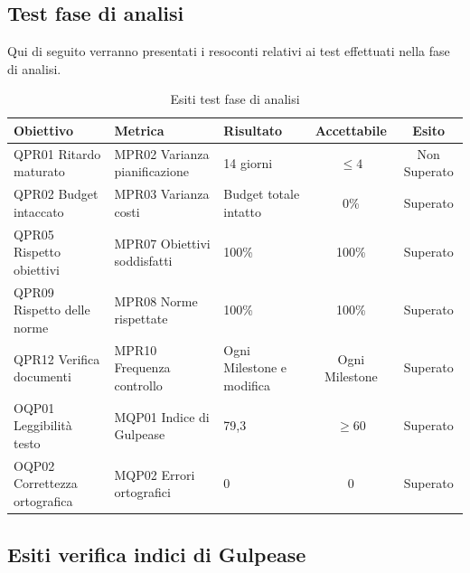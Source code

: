 \documentclass[../piano_di_qualifica.tex]{subfiles}
\begin{document}
\subsection{Test fase di analisi}
Qui di seguito verranno presentati i resoconti relativi ai test effettuati nella fase di analisi. \par

\begin{table}[!ht]
	\centering
	\begin{tabular}{|p{4cm}|p{4cm}|l|c|c|}
		\hline
		\rowcolor{lightgray}
		\textbf{Obiettivo}            & \textbf{Metrica}              & \textbf{Risultato}                     & \textbf{Accettabile} & \textbf{Esito} \\
		\hline
		QPR01 Ritardo maturato        & MPR02 Varianza pianificazione & 14 giorni                              & \(\leq 4\)           & Non Superato   \\
		QPR02 Budget intaccato        & MPR03 Varianza costi          & Budget totale intatto & 0\%                  & Superato       \\
		QPR05 Rispetto obiettivi      & MPR07 Obiettivi soddisfatti   & 100\%                                  & 100\%                & Superato       \\
		QPR09 Rispetto delle norme    & MPR08 Norme rispettate        & 100\%                                  & 100\%                & Superato       \\
		QPR12 Verifica documenti      & MPR10 Frequenza controllo     & Ogni Milestone e modifica         & Ogni Milestone       & Superato       \\
		OQP01 Leggibilità testo       & MQP01 Indice di Gulpease      & 79,3                                   & \(\ge 60\)           & Superato       \\
		OQP02 Correttezza ortografica & MQP02 Errori ortografici      & 0                                      & 0                    & Superato       \\
		\hline
	\end{tabular}
	\caption{Esiti test fase di analisi}
\end{table}


\subsection{Esiti verifica indici di Gulpease}
\label{sub:verif_gul}
\end{document}
